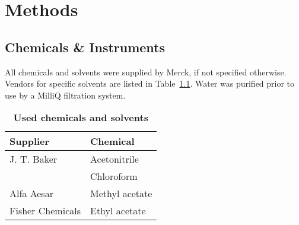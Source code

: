\chapter{Methods}

\section{Chemicals \& Instruments} %
\label{sec:chemicals_&_instruments}

	All chemicals and solvents were supplied by Merck, if not specified otherwise. Vendors for specific solvents are listed in Table~\ref{tab:solvent_table}. Water was purified prior to use by a MilliQ filtration system.

	\begin{table}[htbp]
		\caption[Used chemicals and solvents]{\textbf{Used chemicals and solvents}}
		\label{tab:solvent_table}
		\centering
		\begin{tabularx}{\textwidth}{XX}
			\toprule
			\textbf{Supplier}	&	\textbf{Chemical}	\\
			\midrule
			J. T. Baker			&	Acetonitrile		\\
								&	Chloroform			\\
			Alfa Aesar			&	Methyl acetate		\\
			Fisher Chemicals 	&	Ethyl acetate		\\
		\end{tabularx}
	\end{table}



